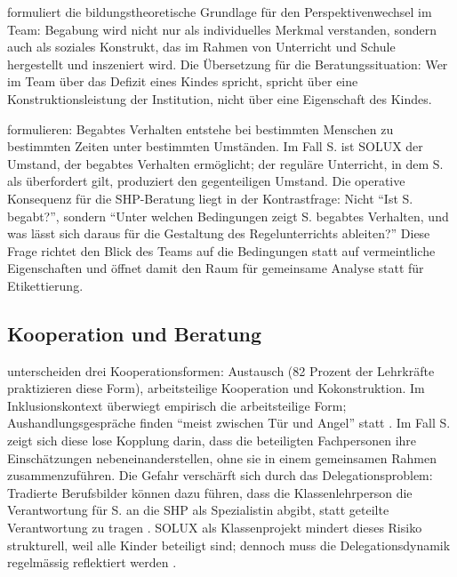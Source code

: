 \documentclass[ngerman, a4paper]{article}
\begin{document}
\textcite[S.\,54]{weigand2021person} formuliert die bildungstheoretische
Grundlage für den Perspektivenwechsel im Team: Begabung wird nicht nur als
individuelles Merkmal verstanden,
sondern auch als soziales Konstrukt, das im Rahmen von Unterricht und Schule
hergestellt und inszeniert wird. Die Übersetzung für die Beratungssituation: Wer im Team über
das Defizit eines Kindes spricht, spricht über eine Konstruktionsleistung der
Institution, nicht über eine Eigenschaft des Kindes.

\textcite[S.\,333\psq]{reisrenzullimueller2021sem} formulieren: Begabtes Verhalten
entstehe bei bestimmten Menschen zu bestimmten Zeiten unter bestimmten Umständen.
Im Fall S. ist SOLUX der Umstand, der begabtes Verhalten ermöglicht; der reguläre
Unterricht, in dem S. als überfordert gilt, produziert den gegenteiligen Umstand.
Die operative Konsequenz für die SHP-Beratung liegt in der Kontrastfrage: Nicht
\enquote{Ist S. begabt?}, sondern \enquote{Unter welchen Bedingungen zeigt S.
  begabtes Verhalten, und was lässt sich daraus für die Gestaltung des
  Regelunterrichts ableiten?} Diese Frage richtet den Blick des Teams auf die
Bedingungen statt auf vermeintliche Eigenschaften und öffnet damit den Raum für
gemeinsame Analyse statt für Etikettierung.

\subsection{Kooperation und Beratung}

\textcite[S.\,463]{groschefussangelgraesel2020kokonstruktion} unterscheiden drei
Kooperationsformen: Austausch (82 Prozent der Lehrkräfte praktizieren diese Form),
arbeitsteilige Kooperation und Kokonstruktion. Im Inklusionskontext überwiegt
empirisch die arbeitsteilige Form; Aushandlungsgespräche finden \enquote{meist
  zwischen Tür und Angel} statt
\parencite[vgl.][S.\,463,\,471]{groschefussangelgraesel2020kokonstruktion}. Im
Fall S. zeigt sich diese lose Kopplung darin, dass die beteiligten Fachpersonen
ihre Einschätzungen nebeneinanderstellen, ohne sie in einem gemeinsamen Rahmen
zusammenzuführen. Die Gefahr verschärft sich durch das Delegationsproblem: Tradierte
Berufsbilder können dazu führen, dass die Klassenlehrperson die Verantwortung für
S. an die SHP als Spezialistin abgibt, statt geteilte Verantwortung zu tragen
\parencite[vgl.][S.\,157]{kummerwyss2017kooperativunterrichten}. SOLUX als
Klassenprojekt mindert dieses Risiko strukturell, weil alle Kinder beteiligt
sind; dennoch muss die Delegationsdynamik regelmässig reflektiert werden
\parencite[vgl.][S.\,157]{kummerwyss2017kooperativunterrichten}.
\end{document}
